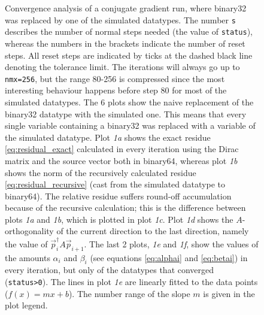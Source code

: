 \documentclass{article}
\theoremstyle{plain} %
\theoremstyle{convention} %
\theoremstyle{remark} %
\def\code#1{\texttt{#1}}
\numberwithin{equation}{section}
\begin{document}
\begin{figure}
    \caption{Convergence analysis of a conjugate gradient run, where \gls{binary32} was replaced by one of the simulated datatypes. The number \code{s} describes the number of normal steps needed (the value of \code{status}), whereas the numbers in the brackets indicate the number of reset steps. All reset steps are indicated by ticks at the dashed black line denoting the tolerance limit. The iterations will always go up to \code{nmx=256}, but the range \num{80}-\num{256} is compressed since the most interesting behaviour happens before step \num{80} for most of the simulated datatypes. The 6 plots show the naive replacement of the \gls{binary32} datatype with the simulated one. This means that every single variable containing a \gls{binary32} was replaced with a variable of the simulated datatype. Plot \textit{1a} shows the exact residue \eqref{eq:residual_exact} calculated in every iteration using the Dirac matrix and the source vector both in \gls{binary64}, whereas plot \textit{1b} shows the norm of the recursively calculated residue \eqref{eq:residual_recursive} (cast from the simulated datatype to \gls{binary64}). The relative residue suffers round-off accumulation because of the recursive calculation; this is the difference between plots \textit{1a} and \textit{1b}, which is plotted in plot \textit{1c}. Plot \textit{1d} shows the $A$-orthogonality of the current direction to the last direction, namely the value of $\vec{p}_{i}^\dagger A \vec{p}_{i+1}$. The last 2 plots, \textit{1e} and \textit{1f}, show the values of the amounts $\alpha_i$ and $\beta_i$ (see equations \eqref{eq:alphai} and \eqref{eq:betai}) in every iteration, but only of the datatypes that converged (\code{status>0}). The lines in plot \textit{1e} are linearly fitted to the data points ($f(x) = m x + b$). The number range of the slope $m$ is given in the plot legend.}
    \label{fig:cgne:naive}
\end{figure}
\end{document}
